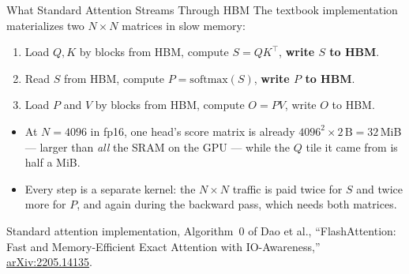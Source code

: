 \begin{frame}{What Standard Attention Streams Through HBM}
    The textbook implementation materializes two $N \times N$ matrices in slow memory:
    \begin{enumerate}\itemsep0.4em
        \item Load $Q, K$ by blocks from HBM, compute $S = QK^\top$, \textbf{write $S$ to HBM}.
        \item Read $S$ from HBM, compute $P = \mathrm{softmax}(S)$, \textbf{write $P$ to HBM}.
        \item Load $P$ and $V$ by blocks from HBM, compute $O = PV$, write $O$ to HBM.
    \end{enumerate}
    \vspace{0.5em}
    \begin{itemize}\itemsep0.4em
        \item At $N = 4096$ in fp16, one head's score matrix is already $4096^2 \times 2\,\text{B} = 32$\,MiB --- larger than \emph{all} the SRAM on the GPU --- while the $Q$ tile it came from is half a MiB.
        \item Every step is a separate kernel: the $N \times N$ traffic is paid twice for $S$ and twice more for $P$, and again during the backward pass, which needs both matrices.
    \end{itemize}
    \vspace{0.5em}
    {\scriptsize Standard attention implementation, Algorithm~0 of Dao et al., ``FlashAttention: Fast and Memory-Efficient Exact Attention with IO-Awareness,'' \href{https://arxiv.org/abs/2205.14135}{arXiv:2205.14135}.}
\end{frame}

